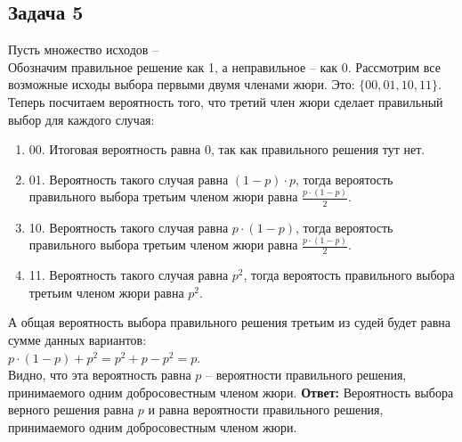 	\subsection{Задача 5}
	Пусть множество исходов -- \\
	Обозначим правильное решение как 1, а неправильное -- как 0. Рассмотрим все возможные исходы выбора первыми двумя членами жюри. Это: $\{00, 01, 10, 11\}$. \\
	Теперь посчитаем вероятность того, что третий член жюри сделает правильный выбор для каждого случая:
	\begin{enumerate}
		\item 00. Итоговая вероятность равна 0, так как правильного решения тут нет.
		\item 01. Вероятность такого случая равна $(1 - p) \cdot p$, тогда вероятость правильного выбора третьим членом жюри равна $\frac{p \cdot (1 -p)}{2}$.
		\item 10. Вероятность такого случая равна $p \cdot (1-p)$, тогда вероятость правильного выбора третьим членом жюри равна $\frac{p \cdot (1 - p)}{2}$.
		\item 11. Вероятность такого случая равна $p^2$, тогда вероятость правильного выбора третьим членом жюри равна $p^2$.
	\end{enumerate}
	А общая вероятность выбора правильного решения третьим из судей будет равна сумме данных вариантов: \\
	$p \cdot (1 - p) + p^2 = p^2 + p - p^2 = p$. \\
	Видно, что эта вероятность равна $p$ -- вероятности правильного решения, принимаемого одним добросовестным членом жюри.
	\textbf{Ответ:} Вероятность выбора верного решения равна $p$ и равна вероятности правильного решения, принимаемого одним добросовестным членом жюри.
	
